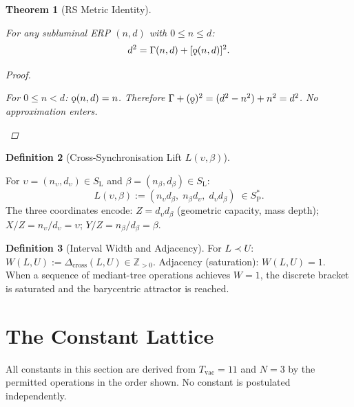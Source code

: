 \documentclass[11pt,letterpaper]{article}
\theoremstyle{plain}
\newtheorem{theorem}{Theorem}[section]
\theoremstyle{definition}
\newtheorem{definition}[theorem]{Definition}
\theoremstyle{remark}
\newcommand{\Z}{\mathbb{Z}}
\newcommand{\SL}{S_{\mathrm{L}}}
\newcommand{\SPs}{S_{\mathrm{P}}^{*}}
\newcommand{\Dcross}{\Delta_{\mathrm{cross}}}
\newcommand{\koppa}{\mathbin{\text{\rm\k{o}}}}
\newcommand{\Tcharge}{\Gamma}
\newcommand{\Tvac}{T_{\mathrm{vac}}}
\begin{document}
\begin{theorem}[RS Metric Identity]\label{thm:metric}
\begin{rsbox}
For any subluminal ERP $(n,d)$ with $0\leq n\leq d$:
\[
d^2 = \Tcharge(n,d) + [\koppa(n,d)]^2.
\]
\end{rsbox}
\begin{proof}
\begin{rsbox}
For $0\leq n<d$: $\koppa(n,d)=n$.  Therefore
$\Tcharge+(\koppa)^2=(d^2-n^2)+n^2=d^2$.
No approximation enters.
\end{rsbox}
\end{proof}
\end{theorem}

\begin{definition}[Cross-Synchronisation Lift
$L(\upsilon,\beta)$]\label{def:lift}
\begin{rsbox}
For $\upsilon=(n_\upsilon,d_\upsilon)\in\SL$ and
$\beta=(n_\beta,d_\beta)\in\SL$:
\[
L(\upsilon,\beta):=
  (n_\upsilon d_\beta,\;n_\beta d_\upsilon,\;d_\upsilon d_\beta)
  \;\in\SPs.
\]
The three coordinates encode:
$Z=d_\upsilon d_\beta$ (geometric capacity, mass depth);
$X/Z=n_\upsilon/d_\upsilon=\upsilon$;
$Y/Z=n_\beta/d_\beta=\beta$.
\end{rsbox}
\end{definition}

\begin{definition}[Interval Width and
Adjacency]\label{def:width}
For $L\prec U$: $W(L,U):=\Dcross(L,U)\in\Z_{>0}$.
Adjacency (saturation): $W(L,U)=1$.  When a sequence of
mediant-tree operations achieves $W=1$, the discrete bracket is
saturated and the barycentric attractor is reached.
\end{definition}

\section{The Constant Lattice}\label{sec:lattice}

All constants in this section are derived from $\Tvac=11$ and $N=3$
by the permitted operations in the order shown.  No constant is
postulated independently.
\end{document}
